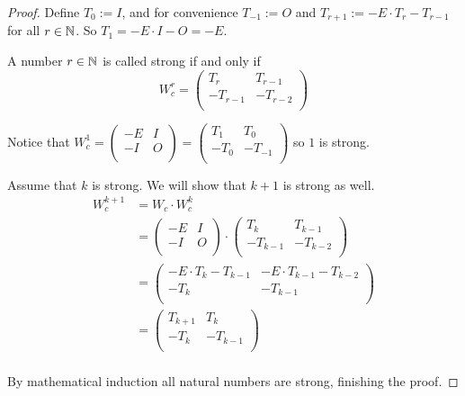 \begin{proof}
  Define $T_{0} := I$, and for convenience $T_{-1} := O$ and
  $T_{r+1} := -E \cdot T_{r} - T_{r-1}$ for all $r\in\mathbb{N}$. So
  $T_{1} = -E \cdot I - O = -E$. 

  A number $r\in\mathbb{N}$ is called strong if and only if
  \[
  W_{c}^{r}
  =
  \left(
  \begin{array}{cc}
     T_{r} &  T_{r-1}  \\
    -T_{r-1} & -T_{r-2} \\
  \end{array}
  \right)
  \]

  Notice that
  $W_{c}^{1} = \left(\begin{smallmatrix} -E & I \\ -I & O \\\end{smallmatrix}\right) = \left(\begin{smallmatrix} T_{1} & T_{0} \\ -T_{0} & -T_{-1} \\\end{smallmatrix}\right)$
  so $1$ is strong.

  Assume that $k$ is strong. We will show that $k+1$ is strong as well.
  \[
  \begin{aligned}
  W_{c}^{k+1}
  & = W_{c} \cdot W_{c}^{k} \\
  & =
  \left(
  \begin{array}{cc}
    -E & I \\
    -I & O \\
  \end{array}
  \right)
  \cdot
  \left(
  \begin{array}{cc}
     T_{k} &  T_{k-1}  \\
    -T_{k-1} & -T_{k-2} \\
  \end{array}
  \right) \\
  & =
  \left(
  \begin{array}{cc}
    -E \cdot T_{k} - T_{k-1} & -E \cdot T_{k-1} - T_{k-2} \\
    -T_{k}                  & -T_{k-1}                  \\
  \end{array}
  \right) \\
  & =
  \left(
  \begin{array}{cc}
     T_{k+1} &  T_{k} \\
    -T_{k} & -T_{k-1} \\
  \end{array}
  \right) \\
  \end{aligned}
  \]

  By mathematical induction all natural numbers are strong, finishing the proof.
\end{proof}


